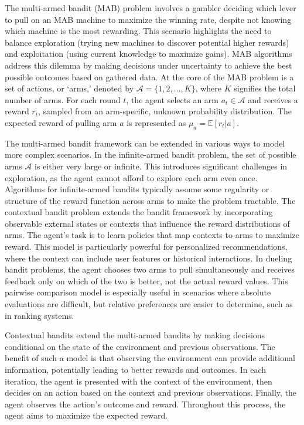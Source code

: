 \documentclass[
  letterpaper,
  numbers=noenddot,
  DIV=11]{scrreprt}
\theoremstyle{plain}
\theoremstyle{definition}
\theoremstyle{remark}
\begin{document}
The multi-armed bandit (MAB) problem involves a gambler deciding which
lever to pull on an MAB machine to maximize the winning rate, despite
not knowing which machine is the most rewarding. This scenario
highlights the need to balance exploration (trying new machines to
discover potential higher rewards) and exploitation (using current
knowledge to maximize gains). MAB algorithms address this dilemma by
making decisions under uncertainty to achieve the best possible outcomes
based on gathered data. At the core of the MAB problem is a set of
actions, or `arms,' denoted by \(\mathcal{A} = \{1, 2, \ldots, K\}\),
where \(K\) signifies the total number of arms. For each round \(t\),
the agent selects an arm \(a_t \in \mathcal{A}\) and receives a reward
\(r_t\), sampled from an arm-specific, unknown probability distribution.
The expected reward of pulling arm \(a\) is represented as
\(\mu_a = \mathbb{E}[r_t | a]\).

The multi-armed bandit framework can be extended in various ways to
model more complex scenarios. In the infinite-armed bandit problem, the
set of possible arms \(\mathcal{A}\) is either very large or infinite.
This introduces significant challenges in exploration, as the agent
cannot afford to explore each arm even once. Algorithms for
infinite-armed bandits typically assume some regularity or structure of
the reward function across arms to make the problem tractable. The
contextual bandit problem extends the bandit framework by incorporating
observable external states or contexts that influence the reward
distributions of arms. The agent's task is to learn policies that map
contexts to arms to maximize reward. This model is particularly powerful
for personalized recommendations, where the context can include user
features or historical interactions. In dueling bandit problems, the
agent chooses two arms to pull simultaneously and receives feedback only
on which of the two is better, not the actual reward values. This
pairwise comparison model is especially useful in scenarios where
absolute evaluations are difficult, but relative preferences are easier
to determine, such as in ranking systems.

Contextual bandits extend the multi-armed bandits by making decisions
conditional on the state of the environment and previous observations.
The benefit of such a model is that observing the environment can
provide additional information, potentially leading to better rewards
and outcomes. In each iteration, the agent is presented with the context
of the environment, then decides on an action based on the context and
previous observations. Finally, the agent observes the action's outcome
and reward. Throughout this process, the agent aims to maximize the
expected reward.
\end{document}
